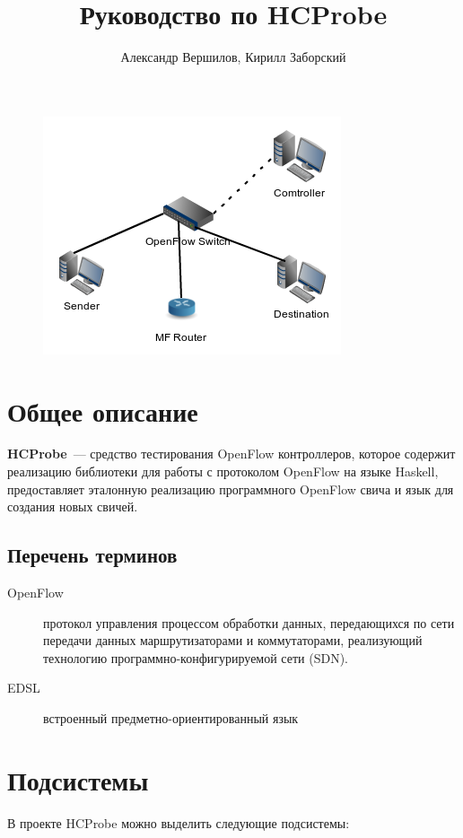 \documentclass[9pt,a4paper]{article}
\title{Руководство по HCProbe}
\author{Александр Вершилов, Кирилл Заборский}
\begin{document}
\maketitle
\begin{figure}[!h]
   \centering 
   \includegraphics[width=0.3\columnwidth]{images/testcfg2.png}
\end{figure}                                                        

\tableofcontents

\pagebreak

\section{Общее описание}

\textbf{HCProbe}~--- средство тестирования OpenFlow контроллеров, которое содержит реализацию библиотеки для работы с протоколом
OpenFlow на языке Haskell, предоставляет эталонную реализацию программного OpenFlow свича и язык для создания новых свичей.

\subsection{Перечень терминов}

\begin{description}
  \item[OpenFlow] протокол управления процессом обработки данных, передающихся
    по сети передачи данных маршрутизаторами и коммутаторами, реализующий
    технологию программно-конфигурируемой сети (SDN).
  \item[EDSL] встроенный предметно-ориентированный язык
\end{description}

\pagebreak

\section{Подсистемы}

В проекте HCProbe можно выделить следующие подсистемы:
\end{document}
